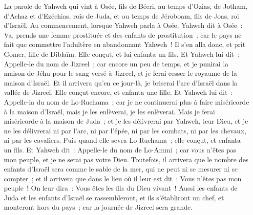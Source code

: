 \begin{multicols}{2}
\VerseOne{}La parole de Yahweh qui vint à Osée, fils de Béeri, au temps d'Ozias, de Jotham, d'Achaz et d'Ezéchias, rois de Juda, et au temps de Jéroboam, fils de Joas, roi d'Israël.
Au commencement, lorsque Yahweh parla à Osée, Yahweh dit à Osée~: Va, prends une femme prostituée et des enfants de prostitution~; car le pays ne fait que commettre l'adultère en abandonnant Yahweh~!
Il s'en alla donc, et prit Gomer, fille de Diblaïm. Elle conçut, et lui enfanta un fils.
Et Yahweh lui dit~: Appelle-le du nom de Jizreel~; car encore un peu de temps, et je punirai la maison de Jéhu pour le sang versé à Jizreel, et je ferai cesser le royaume de la maison d'Israël.
Et il arrivera qu'en ce jour-là, je briserai l'arc d'Israël dans la vallée de Jizreel.
Elle conçut encore, et enfanta une fille. Et Yahweh lui dit~: Appelle-la du nom de Lo-Ruchama~; car je ne continuerai plus à faire miséricorde à la maison d'Israël, mais je les enlèverai, je les enlèverai.
Mais je ferai miséricorde à la maison de Juda~; et je les délivrerai par Yahweh, leur Dieu, et je ne les délivrerai ni par l'arc, ni par l'épée, ni par les combats, ni par les chevaux, ni par les cavaliers.
Puis quand elle sevra Lo-Ruchama~; elle conçut, et enfanta un fils.
Et Yahweh dit~: Appelle-le du nom de Lo-Ammi~; car vous n'êtes pas mon peuple, et je ne serai pas votre Dieu.
\VerseOne{}Toutefois, il arrivera que le nombre des enfants d'Israël sera comme le sable de la mer, qui ne peut ni se mesurer ni se compter~; et il arrivera que dans le lieu où il leur est dit~: Vous n'êtes pas mon peuple~! On leur dira~: Vous êtes les fils du Dieu vivant~!
Aussi les enfants de Juda et les enfants d'Israël se rassembleront, et ils s'établiront un chef, et monteront hors du pays~; car la journée de Jizreel sera grande.

\end{multicols}
